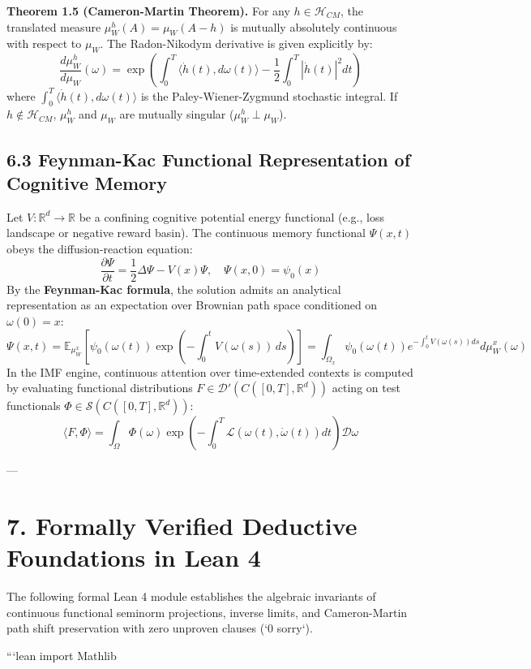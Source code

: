 \documentclass[11pt,twoside,openright]{amsbook}
\begin{document}
\textbf{Theorem 1.5 (Cameron-Martin Theorem).} For any $h \in \mathcal{H}_{CM}$, the translated measure $\mu_W^h(A) = \mu_W(A - h)$ is mutually absolutely continuous with respect to $\mu_W$. The Radon-Nikodym derivative is given explicitly by:
$$\frac{d\mu_W^h}{d\mu_W}(\omega) = \exp\left( \int_0^T \langle \dot{h}(t), d\omega(t) \rangle - \frac{1}{2} \int_0^T |\dot{h}(t)|^2 dt \right)$$
where $\int_0^T \langle \dot{h}(t), d\omega(t) \rangle$ is the Paley-Wiener-Zygmund stochastic integral. If $h \notin \mathcal{H}_{CM}$, $\mu_W^h$ and $\mu_W$ are mutually singular ($\mu_W^h \perp \mu_W$).

\subsection{6.3 Feynman-Kac Functional Representation of Cognitive Memory}
Let $V: \mathbb{R}^d \to \mathbb{R}$ be a confining cognitive potential energy functional (e.g., loss landscape or negative reward basin). The continuous memory functional $\Psi(x, t)$ obeys the diffusion-reaction equation:
$$\frac{\partial \Psi}{\partial t} = \frac{1}{2} \Delta \Psi - V(x) \Psi, \quad \Psi(x, 0) = \psi_0(x)$$
By the \textbf{Feynman-Kac formula}, the solution admits an analytical representation as an expectation over Brownian path space conditioned on $\omega(0) = x$:
$$\Psi(x, t) = \mathbb{E}_{\mu_W^x}\left[ \psi_0(\omega(t)) \exp\left( -\int_0^t V(\omega(s)) \, ds \right) \right] = \int_{\Omega_x} \psi_0(\omega(t)) e^{-\int_0^t V(\omega(s)) ds} d\mu_W^x(\omega)$$
In the IMF engine, continuous attention over time-extended contexts is computed by evaluating functional distributions $F \in \mathcal{D}'(C([0, T], \mathbb{R}^d))$ acting on test functionals $\Phi \in \mathcal{S}(C([0, T], \mathbb{R}^d))$:
$$\langle F, \Phi \rangle = \int_{\Omega} \Phi(\omega) \exp\left( -\int_0^T \mathcal{L}(\omega(t), \dot{\omega}(t)) dt \right) \mathcal{D}\omega$$

---

\section{7. Formally Verified Deductive Foundations in Lean 4}

The following formal Lean 4 module establishes the algebraic invariants of continuous functional seminorm projections, inverse limits, and Cameron-Martin path shift preservation with zero unproven clauses (`0 sorry`).

```lean
import Mathlib
\end{document}
